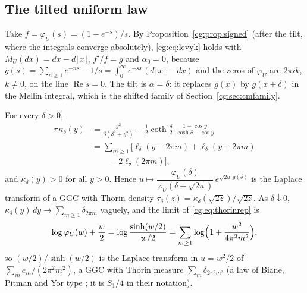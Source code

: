 \subsection{The tilted uniform law}

Take $f=\varphi_U(s)=(1-e^{-s})/s$. By Proposition~\ref{cg:prop:signed} (after the tilt, where the integrals converge absolutely), \eqref{cg:eq:levyk} holds with $M_U(dx)=dx-d\lfloor x\rfloor$, $f'/f=g$ and $\alpha_0=0$, because $g(s)=\sum_{n\ge1}e^{-ns}-1/s=\int_0^\infty e^{-sx}(d\lfloor x\rfloor-dx)$ and the zeros of $\varphi_U$ are $2\pi ik$, $k\ne0$, on the line $\operatorname{Re}s=0$. The tilt is $\alpha=\delta$: it replaces $g(x)$ by $g(x+\delta)$ in the Mellin integral, which is the shifted family of Section~\ref{cg:sec:cmfamily}.

\begin{theorem}\label{cg:thm:uniform}
For every $\delta>0$,
\begin{equation}\label{cg:eq:kappaU}
\begin{split}\pi\kappa_\delta(y)&=\frac{y^2}{\delta(\delta^2+y^2)}-\frac12\coth\frac\delta2\;\frac{1-\cos y}{\cosh\delta-\cos y}\\
&=\sum_{m\ge1}\bigl[\ell_\delta(y-2\pi m)+\ell_\delta(y+2\pi m)\\
&\qquad-2\ell_\delta(2\pi m)\bigr],
\end{split}\end{equation}
and $\kappa_\delta(y)>0$ for all $y>0$. Hence $u\mapsto\dfrac{\varphi_U(\delta)}{\varphi_U(\delta+\sqrt{2u})}\,e^{\sqrt{2u}\,g(\delta)}$ is the Laplace transform of a GGC with Thorin density $\tau_\delta(z)=\kappa_\delta(\sqrt{2z})/\sqrt{2z}$. As $\delta\downarrow0$, $\kappa_\delta(y)\,dy\to\sum_{m\ge1}\delta_{2\pi m}$ vaguely, and the limit of \eqref{cg:eq:thorinrep} is
\[
\log\varphi_U(w)+\frac w2=\log\frac{\sinh(w/2)}{w/2}=\sum_{m\ge1}\log\Bigl(1+\frac{w^2}{4\pi^2m^2}\Bigr),
\]
so $(w/2)/\sinh(w/2)$ is the Laplace transform in $u=w^2/2$ of $\sum_me_m/(2\pi^2m^2)$, a GGC with Thorin measure $\sum_m\delta_{2\pi^2m^2}$ (a law of Biane, Pitman and Yor type \cite{BPY01}; it is $S_1/4$ in their notation).
\end{theorem}

